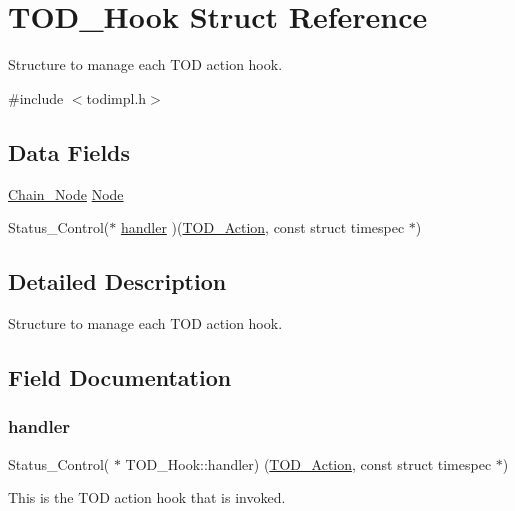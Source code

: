 \hypertarget{structTOD__Hook}{}\section{T\+O\+D\+\_\+\+Hook Struct Reference}
\label{structTOD__Hook}


Structure to manage each T\+OD action hook.  




{\ttfamily \#include $<$todimpl.\+h$>$}

\subsection*{Data Fields}
\begin{DoxyCompactItemize}
\item 
\mbox{\hyperlink{group__RTEMSScoreChain_ga0dd4bfcca1ac7f90de2842e447846d3d}{Chain\+\_\+\+Node}} \mbox{\hyperlink{structTOD__Hook_aa80cc44eeb17aca310a32930ebb8f794}{Node}}
\item 
Status\+\_\+\+Control($\ast$ \mbox{\hyperlink{structTOD__Hook_af4b19d26e678edceb342210b5ded2806}{handler}} )(\mbox{\hyperlink{group__RTEMSScoreTODHooks_gab9b3d7e3a626139950c25efa888d4332}{T\+O\+D\+\_\+\+Action}}, const struct timespec $\ast$)
\end{DoxyCompactItemize}


\subsection{Detailed Description}
Structure to manage each T\+OD action hook. 

\subsection{Field Documentation}
\mbox{\label{structTOD__Hook_af4b19d26e678edceb342210b5ded2806}} 
\subsubsection{\texorpdfstring{handler}{handler}}
{\footnotesize\ttfamily Status\+\_\+\+Control( $\ast$ T\+O\+D\+\_\+\+Hook\+::handler) (\mbox{\hyperlink{group__RTEMSScoreTODHooks_gab9b3d7e3a626139950c25efa888d4332}{T\+O\+D\+\_\+\+Action}}, const struct timespec $\ast$)}

This is the T\+OD action hook that is invoked. \mbox{\label{structTOD__Hook_aa80cc44eeb17aca310a32930ebb8f794}} 
